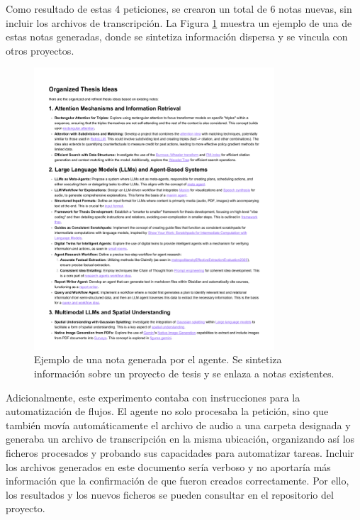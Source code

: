 Como resultado de estas 4 peticiones, se crearon un total de 6 notas nuevas, sin incluir los archivos de transcripción. La Figura \ref{fig:para_synthesis} muestra un ejemplo de una de estas notas generadas, donde se sintetiza información dispersa y se vincula con otros proyectos.

\begin{figure}[h!]
    \centering
    \includegraphics[width=0.8\textwidth]{figures/ideaSynth.pdf} 
    \caption{Ejemplo de una nota generada por el agente. Se sintetiza información sobre un proyecto de tesis y se enlaza a notas existentes.}
    \label{fig:para_synthesis}
\end{figure}

Adicionalmente, este experimento contaba con instrucciones para la automatización de flujos. El agente no solo procesaba la petición, sino que también movía automáticamente el archivo de audio a una carpeta designada y generaba un archivo de transcripción en la misma ubicación, organizando así los ficheros procesados y probando sus capacidades para automatizar tareas. Incluir los archivos generados en este documento sería verboso y no aportaría más información que la confirmación de que fueron creados correctamente. Por ello, los resultados y los nuevos ficheros se pueden consultar en el repositorio del proyecto.

